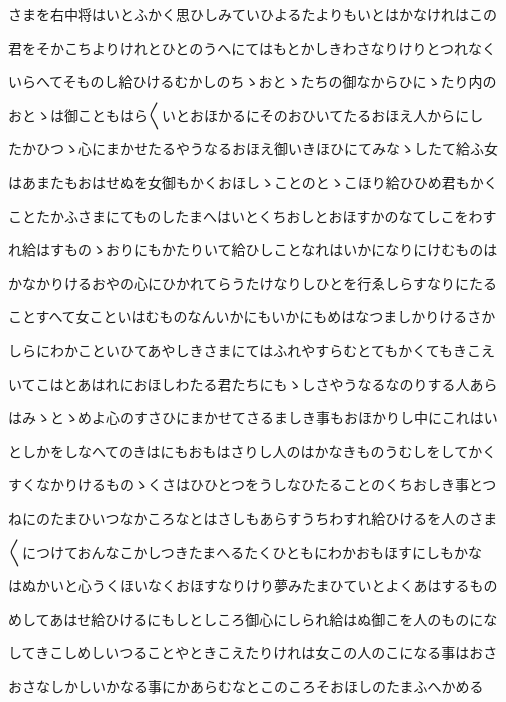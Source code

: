 \documentclass[a4paper,11pt,landscape]{ltjtarticle}
\begin{document}
さまを右中将はいとふかく思ひしみていひよるたよりもいとはかなけれはこの
\par\medskip
君をそかこちよりけれとひとのうへにてはもとかしきわさなりけりとつれなく
\par\medskip
いらへてそものし給ひけるむかしのちゝおとゝたちの御なからひにゝたり内の
\par\medskip
おとゝは御こともはら〱いとおほかるにそのおひいてたるおほえ人からにし
\par\medskip
たかひつゝ心にまかせたるやうなるおほえ御いきほひにてみなゝしたて給ふ女
\par\medskip
はあまたもおはせぬを女御もかくおほしゝことのとゝこほり給ひひめ君もかく
\par\medskip
ことたかふさまにてものしたまへはいとくちおしとおほすかのなてしこをわす
\par\medskip
れ給はすものゝおりにもかたりいて給ひしことなれはいかになりにけむものは
\par\medskip
かなかりけるおやの心にひかれてらうたけなりしひとを行ゑしらすなりにたる
\par\medskip
ことすへて女こといはむものなんいかにもいかにもめはなつましかりけるさか
\par\medskip
しらにわかこといひてあやしきさまにてはふれやすらむとてもかくてもきこえ
\par\medskip
いてこはとあはれにおほしわたる君たちにもゝしさやうなるなのりする人あら
\par\medskip
はみゝとゝめよ心のすさひにまかせてさるましき事もおほかりし中にこれはい
\par\medskip
としかをしなへてのきはにもおもはさりし人のはかなきものうむしをしてかく
\par\medskip
すくなかりけるものゝくさはひひとつをうしなひたることのくちおしき事とつ
\par\medskip
ねにのたまひいつなかころなとはさしもあらすうちわすれ給ひけるを人のさま
\par\medskip
〱につけておんなこかしつきたまへるたくひともにわかおもほすにしもかな
\par\medskip
はぬかいと心うくほいなくおほすなりけり夢みたまひていとよくあはするもの
\par\medskip
めしてあはせ給ひけるにもしとしころ御心にしられ給はぬ御こを人のものにな
\par\medskip
してきこしめしいつることやときこえたりけれは女この人のこになる事はおさ
\par\medskip
おさなしかしいかなる事にかあらむなとこのころそおほしのたまふへかめる
\par\medskip
\end{document}
